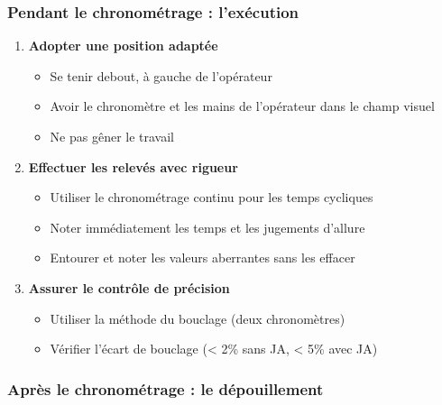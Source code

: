\documentclass[a4paper,12pt]{article}
\begin{document}
\subsubsection*{Pendant le chronométrage : l'exécution}

\begin{enumerate}
    \item \textbf{Adopter une position adaptée}
    \begin{itemize}
        \item Se tenir debout, à gauche de l'opérateur
        \item Avoir le chronomètre et les mains de l'opérateur dans le champ visuel
        \item Ne pas gêner le travail
    \end{itemize}
    
    \item \textbf{Effectuer les relevés avec rigueur}
    \begin{itemize}
        \item Utiliser le chronométrage continu pour les temps cycliques
        \item Noter immédiatement les temps et les jugements d'allure
        \item Entourer et noter les valeurs aberrantes sans les effacer
    \end{itemize}
    
    \item \textbf{Assurer le contrôle de précision}
    \begin{itemize}
        \item Utiliser la méthode du bouclage (deux chronomètres)
        \item Vérifier l'écart de bouclage (< 2\% sans JA, < 5\% avec JA)
    \end{itemize}
\end{enumerate}

\subsubsection*{Après le chronométrage : le dépouillement}
\end{document}
